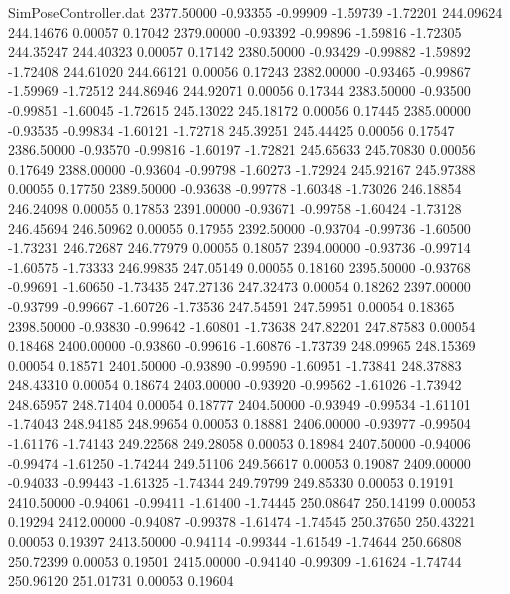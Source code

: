 \begin{filecontents}{SimPoseController.dat}
2377.50000   -0.93355   -0.99909    -1.59739   -1.72201  244.09624  244.14676    0.00057    0.17042
2379.00000   -0.93392   -0.99896    -1.59816   -1.72305  244.35247  244.40323    0.00057    0.17142
2380.50000   -0.93429   -0.99882    -1.59892   -1.72408  244.61020  244.66121    0.00056    0.17243
2382.00000   -0.93465   -0.99867    -1.59969   -1.72512  244.86946  244.92071    0.00056    0.17344
2383.50000   -0.93500   -0.99851    -1.60045   -1.72615  245.13022  245.18172    0.00056    0.17445
2385.00000   -0.93535   -0.99834    -1.60121   -1.72718  245.39251  245.44425    0.00056    0.17547
2386.50000   -0.93570   -0.99816    -1.60197   -1.72821  245.65633  245.70830    0.00056    0.17649
2388.00000   -0.93604   -0.99798    -1.60273   -1.72924  245.92167  245.97388    0.00055    0.17750
2389.50000   -0.93638   -0.99778    -1.60348   -1.73026  246.18854  246.24098    0.00055    0.17853
2391.00000   -0.93671   -0.99758    -1.60424   -1.73128  246.45694  246.50962    0.00055    0.17955
2392.50000   -0.93704   -0.99736    -1.60500   -1.73231  246.72687  246.77979    0.00055    0.18057
2394.00000   -0.93736   -0.99714    -1.60575   -1.73333  246.99835  247.05149    0.00055    0.18160
2395.50000   -0.93768   -0.99691    -1.60650   -1.73435  247.27136  247.32473    0.00054    0.18262
2397.00000   -0.93799   -0.99667    -1.60726   -1.73536  247.54591  247.59951    0.00054    0.18365
2398.50000   -0.93830   -0.99642    -1.60801   -1.73638  247.82201  247.87583    0.00054    0.18468
2400.00000   -0.93860   -0.99616    -1.60876   -1.73739  248.09965  248.15369    0.00054    0.18571
2401.50000   -0.93890   -0.99590    -1.60951   -1.73841  248.37883  248.43310    0.00054    0.18674
2403.00000   -0.93920   -0.99562    -1.61026   -1.73942  248.65957  248.71404    0.00054    0.18777
2404.50000   -0.93949   -0.99534    -1.61101   -1.74043  248.94185  248.99654    0.00053    0.18881
2406.00000   -0.93977   -0.99504    -1.61176   -1.74143  249.22568  249.28058    0.00053    0.18984
2407.50000   -0.94006   -0.99474    -1.61250   -1.74244  249.51106  249.56617    0.00053    0.19087
2409.00000   -0.94033   -0.99443    -1.61325   -1.74344  249.79799  249.85330    0.00053    0.19191
2410.50000   -0.94061   -0.99411    -1.61400   -1.74445  250.08647  250.14199    0.00053    0.19294
2412.00000   -0.94087   -0.99378    -1.61474   -1.74545  250.37650  250.43221    0.00053    0.19397
2413.50000   -0.94114   -0.99344    -1.61549   -1.74644  250.66808  250.72399    0.00053    0.19501
2415.00000   -0.94140   -0.99309    -1.61624   -1.74744  250.96120  251.01731    0.00053    0.19604

\end{filecontents}
